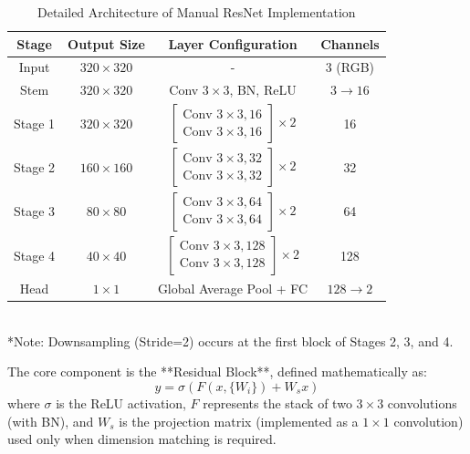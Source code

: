 \begin{table}[htbp]
\centering
\caption{Detailed Architecture of Manual ResNet Implementation}
\label{tab:resnet_arch}
\begin{tabular}{c|c|c|c} 
\hline
\textbf{Stage} & \textbf{Output Size} & \textbf{Layer Configuration} & \textbf{Channels} \\
\hline
Input & $320 \times 320$ & - & 3 (RGB) \\
\hline
Stem & $320 \times 320$ & Conv $3\times3$, BN, ReLU & $3 \rightarrow 16$ \\
\hline
Stage 1 & $320 \times 320$ & $\begin{bmatrix} \text{Conv } 3\times3, 16 \\ \text{Conv } 3\times3, 16 \end{bmatrix} \times 2$ & 16 \\
\hline
Stage 2 & $160 \times 160$ & $\begin{bmatrix} \text{Conv } 3\times3, 32 \\ \text{Conv } 3\times3, 32 \end{bmatrix} \times 2$ & 32 \\
\hline
Stage 3 & $80 \times 80$ & $\begin{bmatrix} \text{Conv } 3\times3, 64 \\ \text{Conv } 3\times3, 64 \end{bmatrix} \times 2$ & 64 \\
\hline
Stage 4 & $40 \times 40$ & $\begin{bmatrix} \text{Conv } 3\times3, 128 \\ \text{Conv } 3\times3, 128 \end{bmatrix} \times 2$ & 128 \\
\hline
Head & $1 \times 1$ & Global Average Pool + FC & $128 \rightarrow 2$ \\
\hline
\end{tabular} \\
\footnotesize{*Note: Downsampling (Stride=2) occurs at the first block of Stages 2, 3, and 4.}
\end{table}

The core component is the **Residual Block**, defined mathematically as:
\begin{equation}
y = \sigma(F(x, \{W_i\}) + W_s x)
\end{equation}
where $\sigma$ is the ReLU activation, $F$ represents the stack of two $3 \times 3$ convolutions (with BN), and $W_s$ is the projection matrix (implemented as a $1 \times 1$ convolution) used only when dimension matching is required.

